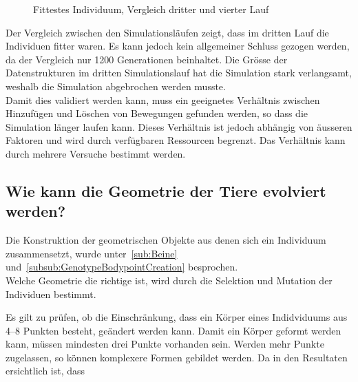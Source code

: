       \begin{figure}[H]
        \centering
        
        \caption{Fittestes Individuum, Vergleich dritter und vierter Lauf}
      \end{figure}

      Der Vergleich zwischen den Simulationsläufen zeigt, dass im dritten Lauf die Individuen fitter waren.
      Es kann jedoch kein allgemeiner Schluss gezogen werden, da der Vergleich nur 1200 Generationen beinhaltet.
      Die Grösse der Datenstrukturen im dritten Simulationslauf hat die Simulation stark verlangsamt,
      weshalb die Simulation abgebrochen werden musste.
      \\
      Damit dies validiert werden kann,
      muss ein geeignetes Verhältnis zwischen Hinzufügen und Löschen von Bewegungen gefunden werden,
      so dass die Simulation länger laufen kann.
      Dieses Verhältnis ist jedoch abhängig von äusseren Faktoren und wird durch verfügbaren Ressourcen begrenzt.
      Das Verhältnis kann durch mehrere Versuche bestimmt werden.

    \subsection{Wie kann die Geometrie der Tiere evolviert werden?}

      Die Konstruktion der geometrischen Objekte aus denen sich ein Individuum zusammensetzt,
      wurde unter~\vref{sub:Beine} und~\vref{subsub:GenotypeBodypointCreation} besprochen.
      \\
      Welche Geometrie die richtige ist, wird durch die Selektion und Mutation der Individuen bestimmt.


      \smallskip


      Es gilt zu prüfen, ob die Einschränkung, dass ein Körper eines Indidviduums aus 4--8 Punkten besteht,
      geändert werden kann.
      Damit ein Körper geformt werden kann, müssen mindesten drei Punkte vorhanden sein.
      Werden mehr Punkte zugelassen, so können komplexere Formen gebildet werden.
      Da in den Resultaten ersichtlich ist, dass

      \smallskip




